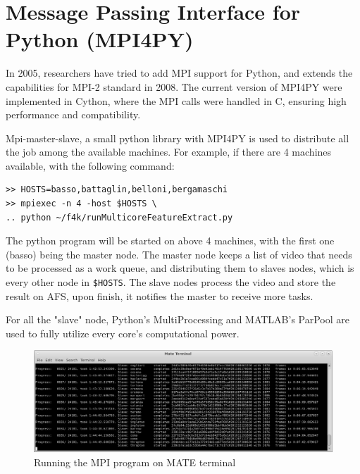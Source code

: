 \documentclass[bsc,logo,twoside,fullspacing,parskip]{infthesis}
\begin{document}
\section{Message Passing Interface for Python (MPI4PY)}

In 2005, researchers have tried to add MPI support for Python\cite{MPI4PY}, and extends the capabilities for MPI-2 standard in 2008\cite{MPI4PY2}. The current version of MPI4PY\cite{MPI4PY3} were implemented in Cython, where the MPI calls were handled in C, ensuring high performance and compatibility.

Mpi-master-slave\cite{L5}, a small python library with MPI4PY is used to distribute all the job among the available machines. 
For example, if there are 4 machines available, with the following command: 
\lstset{basicstyle=\footnotesize\ttfamily,breaklines=true}
\begin{lstlisting}[frame=single]
>> HOSTS=basso,battaglin,belloni,bergamaschi
>> mpiexec -n 4 -host $HOSTS \
.. python ~/f4k/runMulticoreFeatureExtract.py
\end{lstlisting}
The python program will be started on above 4 machines, with the first one (basso) being the master node.
The master node keeps a list of video that needs to be processed as a work queue, and distributing them to slaves nodes, which is every other node in {\tt \$HOSTS}. 
The slave nodes process the video and store the result on AFS, upon finish, it notifies the master to receive more tasks.


For all the "slave" node, Python's MultiProcessing and MATLAB's ParPool are used to fully utilize every core's computational power.

\begin{figure}
    \centering
    \includegraphics[scale=0.30]{graph/sample_terminal.png}
    \caption{Running the MPI program on MATE terminal}
    \label{fig:mpi}
\end{figure}
\end{document}
